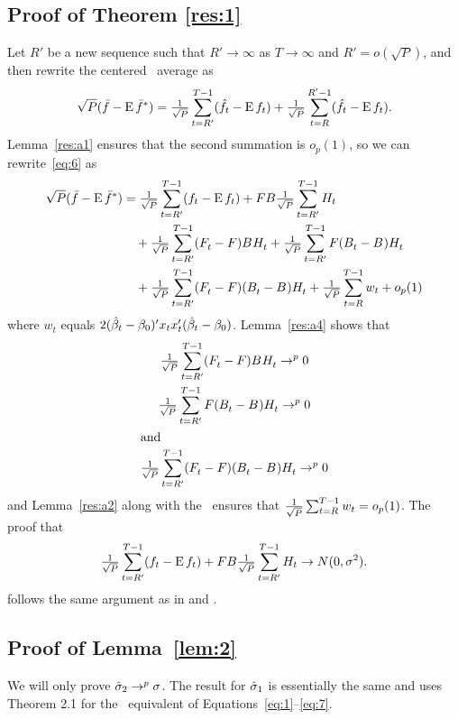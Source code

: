 \documentclass[12pt,fleqn]{article}
\begin{document}
\subsection{Proof of Theorem \ref{res:1}}
  Let $R'$ be a new sequence such that $R' \to \infty$ as $T \to \infty$
  and $R' = o(\sqrt{P})$, and then rewrite the centered \oos\ average as
  \begin{equation}\label{eq:6}
    \sqrt{P} (\bar{f} - \operatorname{E} \bar{f}^*)
    = \tfrac{1}{\sqrt{P}} \sum_{t=R'}^{T-1} (\hat{f}_t - \operatorname{E} f_t)
      + \tfrac{1}{\sqrt{P}} \sum_{t=R}^{R'-1} (\hat{f}_t - \operatorname{E} f_t).
  \end{equation}
  Lemma~\ref{res:a1} ensures that the second summation is $o_p(1)$, so
  we can rewrite~\eqref{eq:6} as
  \begin{align*}
    \sqrt{P} (\bar{f} - \operatorname{E} \bar{f}^*)
    &= \tfrac{1}{\sqrt{P}} \sum_{t=R'}^{T-1} (f_t - \operatorname{E} f_t) + F B \tfrac{1}{\sqrt{P}} \sum_{t=R'}^{T-1} H_t \\
    & \quad + \tfrac{1}{\sqrt{P}} \sum_{t=R'}^{T-1} (F_t^{} - F) B^{} H_t^{} + \tfrac{1}{\sqrt{P}} \sum_{t=R'}^{T-1} F (B_t^{} - B^{}) H_t^{} \\ & \quad + \tfrac{1}{\sqrt{P}} \sum_{t=R'}^{T-1} (F_t^{} - F) (B_t^{} - B^{}) H_t^{} + \tfrac{1}{\sqrt{P}} \sum_{t=R}^{T-1} w_t + o_p(1)
  \end{align*}
  where $w_t$ equals $2 (\bh_t - \btrue)' x_t x_t' (\bh_t - \btrue)$.
  Lemma~\ref{res:a4} shows that
  \begin{gather}
    \tfrac{1}{\sqrt{P}} \sum_{t=R'}^{T-1} (F_t^{} - F) B^{} H_t^{} \to^{p} 0 \label{eq:11} \\
    \tfrac{1}{\sqrt{P}} \sum_{t=R'}^{T-1} F (B_t^{} - B^{}) H_t^{} \to^{p} 0 \label{eq:12} \\
    \intertext{and}
    \tfrac{1}{\sqrt{P}} \sum_{t=R'}^{T-1} (F_t^{} - F) (B_t^{} - B^{}) H_t^{} \to^{p} 0 \label{eq:13}
  \end{gather}
  and Lemma~\ref{res:a2} along with the \clt\ ensures that $\tfrac{1}{\sqrt{P}} \sum_{t=R}^{T-1}
  w_t = o_{p}(1)$. The proof that
  \begin{equation*}
    \tfrac{1}{\sqrt{P}} \sum_{t=R'}^{T-1} (f_t - \operatorname{E} f_t) + F B \tfrac{1}{\sqrt{P}} \sum_{t=R'}^{T-1} H_t \to N(0, \sigma^2).
  \end{equation*}
  follows the same argument as in \citet{Wes:96} and \citet{Mcc:00}.

\subsection{Proof of Lemma~\ref{lem:2}}

We will only prove $\hat\sigma_2 \to^p \sigma$. The result for
$\hat\sigma_1$ is essentially the same and uses  Theorem
2.1 for the \hac\ equivalent of Equations~\eqref{eq:1}--\eqref{eq:7}.
\end{document}
